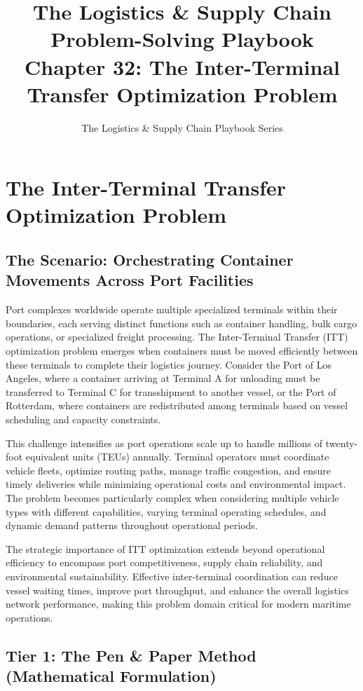 \documentclass{article}
\title{The Logistics \& Supply Chain Problem-Solving Playbook\\
Chapter 32: The Inter-Terminal Transfer Optimization Problem}
\author{The Logistics \& Supply Chain Playbook Series}
\date{}
\begin{document}
\maketitle

\section{The Inter-Terminal Transfer Optimization Problem}

\subsection{The Scenario: Orchestrating Container Movements Across Port Facilities}

Port complexes worldwide operate multiple specialized terminals within their boundaries, each serving distinct functions such as container handling, bulk cargo operations, or specialized freight processing. The Inter-Terminal Transfer (ITT) optimization problem emerges when containers must be moved efficiently between these terminals to complete their logistics journey. Consider the Port of Los Angeles, where a container arriving at Terminal A for unloading must be transferred to Terminal C for transshipment to another vessel, or the Port of Rotterdam, where containers are redistributed among terminals based on vessel scheduling and capacity constraints.

This challenge intensifies as port operations scale up to handle millions of twenty-foot equivalent units (TEUs) annually. Terminal operators must coordinate vehicle fleets, optimize routing paths, manage traffic congestion, and ensure timely deliveries while minimizing operational costs and environmental impact. The problem becomes particularly complex when considering multiple vehicle types with different capabilities, varying terminal operating schedules, and dynamic demand patterns throughout operational periods.

The strategic importance of ITT optimization extends beyond operational efficiency to encompass port competitiveness, supply chain reliability, and environmental sustainability. Effective inter-terminal coordination can reduce vessel waiting times, improve port throughput, and enhance the overall logistics network performance, making this problem domain critical for modern maritime operations.

\subsection{Tier 1: The Pen \& Paper Method (Mathematical Formulation)}
\end{document}

